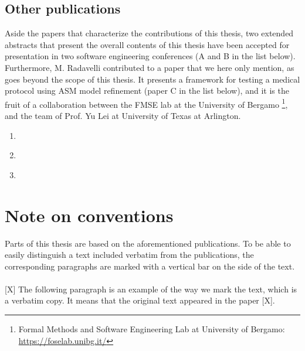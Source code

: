 \subsection{Other publications}

Aside the papers that characterize the contributions of this thesis, two extended abstracts that present the overall contents of this thesis have been accepted for presentation in two software engineering conferences (A and B in the list below).
Furthermore, M. Radavelli contributed to a paper that we here only mention, as goes beyond the scope of this thesis. It presents a framework for testing a medical protocol using ASM model refinement (paper C in the list below), and it is the fruit of a collaboration between the FMSE lab at the University of Bergamo \footnote{Formal Methods and Software Engineering Lab at University of Bergamo: \url{https://foselab.unibg.it/}}, and the  team of Prof. Yu Lei at University of Texas at Arlington.

\begin{enumerate}
	\renewcommand{\theenumi}{\Alph{enumi}} %
	\item \cite{radavelli2019using} 
	
	\item \cite{Radavelli:2019:UST:3338906.3342508} 
	
	\item \cite{bonfanti_ictss_2019} 
\end{enumerate}

\section{Note on conventions}
Parts of this thesis are based on the aforementioned publications. To be able to easily distinguish a text included verbatim from the publications, the corresponding paragraphs are marked with a vertical bar on the side of the text.

\paragraph{}
\begin{tikzborder}{[X]}
The following paragraph is an example of the way we mark the text, which is a verbatim copy. It means that the original text appeared in the paper [X].
\end{tikzborder}

